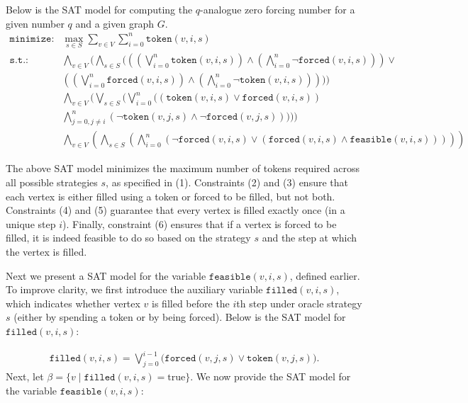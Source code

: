 \documentclass[11pt]{article}
\theoremstyle{plain}
\theoremstyle{definition}
\theoremstyle{remark}
\begin{document}
Below is the SAT model for computing the $q$-analogue zero forcing number for a given number $q$ and a given graph $G$.
\begin{align}
    \texttt{minimize:} & \max_{s \in S} \sum_{v \in V}\sum_{i=0}^n \texttt{token}(v,i,s)\\
    \texttt{s.t.:} &\bigwedge_{v \in V} (\bigwedge_{s \in S}(((\bigvee_{i=0}^n \texttt{token}(v,i,s)) \wedge (\bigwedge_{i=0}^n \neg \texttt{forced}(v,i,s)) ) \vee \\
    &((\bigvee_{i=0}^n \texttt{forced}(v,i,s)) \wedge (\bigwedge_{i=0}^n \neg \texttt{token}(v,i,s)))))\\
    &\bigwedge_{v \in V}(\bigvee_{s \in S}(\bigvee_{i=0}^n((\texttt{token}(v,i,s) \vee \texttt{forced}(v,i,s))\\
    &\bigwedge_{j=0, j \neq i} ^ n (\neg \texttt{token}(v,j,s) \wedge \neg\texttt{forced}(v,j,s)))))\\
    &\bigwedge_{v \in V}(\bigwedge_{s \in S}(\bigwedge_{i=0}^n(\neg\texttt{forced}(v,i,s) \vee (\texttt{forced}(v,i,s) \wedge \texttt{feasible}(v,i,s)))))
\end{align}


The above SAT model minimizes the maximum number of tokens required across all possible strategies $s$, as specified in (1). Constraints (2) and (3) ensure that each vertex is either filled using a token or forced to be filled, but not both. Constraints (4) and (5) guarantee that every vertex is filled exactly once (in a unique step $i$). Finally, constraint (6) ensures that if a vertex is forced to be filled, it is indeed feasible to do so based on the strategy $s$ and the step at which the vertex is filled.


Next we present a SAT model for the variable $\texttt{feasible}(v,i,s)$, defined earlier.  
To improve clarity, we first introduce the auxiliary variable $\texttt{filled}(v,i,s)$, which indicates whether vertex $v$ is filled before the $i$th step under oracle strategy $s$ (either by spending a token or by being forced). Below is the SAT model for $\texttt{filled}(v, i, s)$:

\begin{align}
    \texttt{filled}(v,i,s) = \bigvee_{j=0}^{i-1} \big( \texttt{forced}(v,j,s) \vee \texttt{token}(v,j,s) \big).
\end{align}
Next, let $\beta = \{v \mid \texttt{filled}(v,i,s) = \text{true}\}$.  
We now provide the SAT model for the variable $\texttt{feasible}(v,i,s)$:
\end{document}
